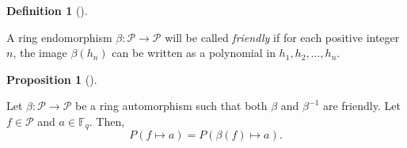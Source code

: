 \documentclass[numbers=enddot,12pt,final,onecolumn,notitlepage]{scrartcl}%
\theoremstyle{definition}
\newtheorem{prop}[theo]{Proposition}
\newenvironment{proposition}[1][]
{\begin{prop}[#1]\begin{leftbar}}
{\end{leftbar}\end{prop}}
\newtheorem{defi}[theo]{Definition}
\newenvironment{definition}[1][]
{\begin{defi}[#1]\begin{leftbar}}
{\end{leftbar}\end{defi}}
\theoremstyle{plainsl}
\begin{document}
\begin{definition}
A ring endomorphism $\beta:\mathcal{P}\rightarrow\mathcal{P}$ will be called
\emph{friendly} if for each positive integer $n$, the image $\beta\left(
h_{n}\right)  $ can be written as a polynomial in $h_{1},h_{2},\ldots,h_{n}$.
\end{definition}

\begin{proposition}
\label{prop.friendly-aut}Let $\beta:\mathcal{P}\rightarrow\mathcal{P}$ be a
ring automorphism such that both $\beta$ and $\beta^{-1}$ are friendly. Let
$f\in\mathcal{P}$ and $a\in\mathbb{F}_{q}$. Then,%
\[
P\left(  f\mapsto a\right)  =P\left(  \beta\left(  f\right)  \mapsto a\right)
.
\]

\end{proposition}
\end{document}
